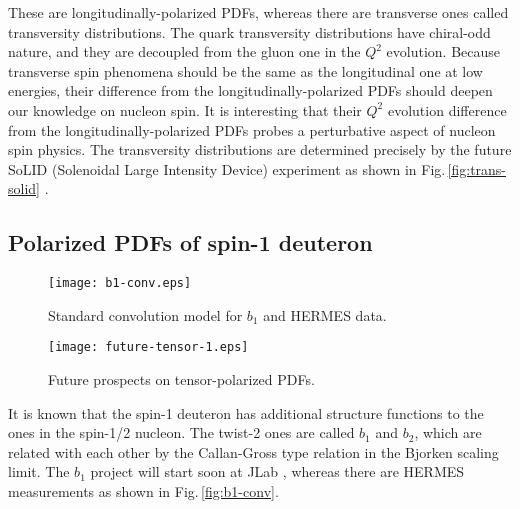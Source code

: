 \documentclass{PoS}
\begin{document}
These are longitudinally-polarized PDFs, whereas there are
transverse ones called transversity distributions. 
The quark transversity distributions have chiral-odd nature,
and they are decoupled from the gluon one in the $Q^2$ evolution.
Because transverse spin phenomena should be the same as
the longitudinal one at low energies, their difference
from the longitudinally-polarized PDFs should deepen
our knowledge on nucleon spin. It is interesting that 
their $Q^2$ evolution difference from the longitudinally-polarized PDFs 
probes a perturbative aspect of nucleon spin physics.
The transversity distributions are determined precisely by the future
SoLID (Solenoidal Large Intensity Device) experiment
as shown in Fig.\,\ref{fig:trans-solid} \cite{trans-solid-2017}.

\subsection{Polarized PDFs of spin-1 deuteron}
\label{spin-1-deuteron}

\begin{wrapfigure}[20]{r}{0.41\textwidth}
   \vspace{-0.7cm}
   \begin{center}
     \texttt{[image: b1-conv.eps]}
\vspace{-0.40cm}
\caption{Standard convolution model for $b_1$ 
and HERMES data.}
\label{fig:b1-conv}
\vspace{+0.60cm}
     \texttt{[image: future-tensor-1.eps]}
\vspace{-0.40cm}
\caption{Future prospects on tensor-polarized PDFs.}
\label{fig:future-tensor}
   \end{center}
\end{wrapfigure}

It is known that the spin-1 deuteron has additional structure functions
to the ones in the spin-1/2 nucleon. The twist-2 ones are called
$b_1$ and $b_2$, which are related with each other by the Callan-Gross
type relation in the Bjorken scaling limit. The $b_1$ project will
start soon at JLab \cite{jlab-b1-fermilab}, whereas
there are HERMES measurements as shown in Fig.\,\ref{fig:b1-conv}. 
\end{document}
